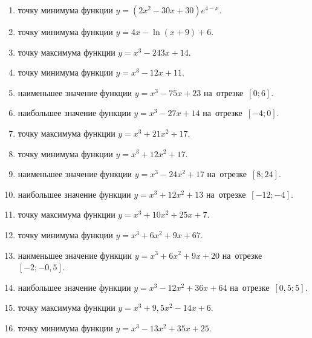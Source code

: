 \documentclass[a4paper,10pt]{article}
\begin{document}
\begin{enumerate}
\item {} точку минимума функции $y=\left(2x^2-30x+30\right){{e}^{4-x}}$.

\item {} точку минимума функции $y=4x-\ln \left(x+9\right)+6$.

\item {} точку максимума функции $y=x^3 -243x +14$.

\item {} точку минимума функции $y=x^3 -12x+11$.

\item {} наименьшее значение функции $y=x^3 -75x+23$ на~отрезке~$\left[0;6\right]$.

\item {} наибольшее значение функции $y=x^3 -27x+14$ на~отрезке~$\left[-4;0\right]$.

\item {} точку максимума функции $y=x^3 +21x^2+17$.

\item {} точку минимума функции $y=x^3 +12x^2+17$.

\item {} наименьшее значение функции $y=x^3 -24x^2+17$ на~отрезке~$\left[8;24\right]$.

\item {} наибольшее значение функции $y=x^3 +12x^2+13$ на~отрезке~$\left[-12;-4\right]$.

\item {} точку максимума функции $y=x^3 +10x^2+25x+7$.

\item {} точку минимума функции $y=x^3 +6x^2+9x+67$.

\item {} наименьшее значение функции $y=x^3 +6x^2+9x+20$ на~отрезке~$\left[-2;-0,5\right]$.

\item {} наибольшее значение функции $y=x^3 -12x^2+36x+64$ на~отрезке~$\left[0,5;5\right]$.

\item {} точку максимума функции $y=x^3 +9,5x^2-14x+6$.

\item {} точку минимума функции $y=x^3 -13x^2+35x+25$.


\end{enumerate}
\end{document}
